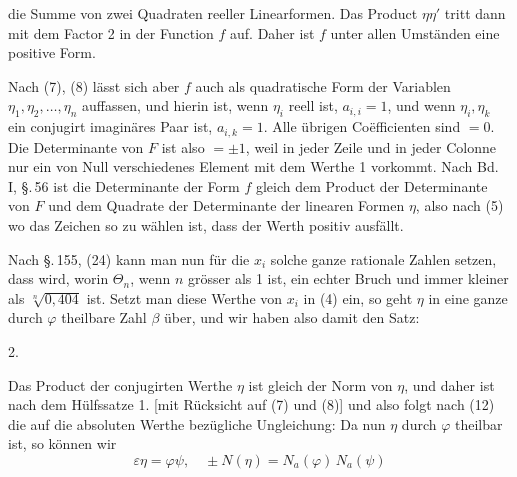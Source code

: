 die Summe von zwei Quadraten reeller Linearformen. Das Product
 $\eta \eta'$ tritt dann mit dem Factor 2 in der Function $f$ auf.
Daher ist $f$ unter allen Umst\"anden eine positive Form.

Nach (7), (8) l\"asst sich aber $f$ auch als quadratische Form
der Variablen $\eta_1, \eta_2, \ldots, \eta_n$
auffassen, und hierin ist, wenn $\eta_i$ reell ist, $a_{i,i} = 1$, und wenn
$\eta_i, \eta_k$ ein conjugirt imagin\"ares Paar ist, $a_{i,k} = 1$. Alle \"ubrigen
Co\"efficienten sind $= 0$. Die Determinante von $F$ ist also $= \pm 1$,
weil in jeder Zeile und in jeder Colonne nur ein von Null verschiedenes
 Element mit dem Werthe 1 vorkommt. Nach Bd. I,
\S.\,56 ist die Determinante der Form $f$ gleich dem Product der
Determinante von $F$ und dem Quadrate der Determinante der
linearen Formen $\eta$, also nach (5)
wo das Zeichen so zu w\"ahlen ist, dass der Werth positiv ausf\"allt.

Nach \S.\,155, (24) kann man nun f\"ur die $x_i$ solche ganze
rationale Zahlen setzen, dass
wird, worin $\Theta_n$, wenn $n$ gr\"osser als 1 ist, ein echter Bruch und
immer kleiner als $\sqrt[n]{0{,}404}$ ist. Setzt man diese Werthe von $x_i$ in
(4) ein, so geht $\eta$ in eine ganze durch $\varphi$ theilbare Zahl $\beta$ \"uber,
und wir haben also damit den Satz:

2. 

Das Product der conjugirten Werthe $\eta$ ist gleich der Norm
von $\eta$, und daher ist nach dem H\"ulfssatze 1. [mit R\"ucksicht auf
(7) und (8)]
und also folgt nach (12) die auf die absoluten Werthe bez\"ugliche
 Ungleichung:
Da nun $\eta$ durch $\varphi$ theilbar ist, so k\"onnen wir
\[ \varepsilon \eta = \varphi \psi, \quad \pm N(\eta) = N_a(\varphi)\, N_a(\psi) \]
